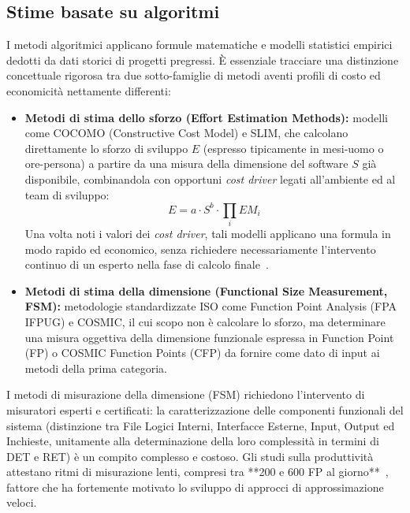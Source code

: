 \documentclass[11pt, a4paper]{article}
\begin{document}
\subsection{Stime basate su algoritmi}\label{sec:algoritmici}
I metodi algoritmici applicano formule matematiche e modelli statistici empirici dedotti da dati storici di progetti pregressi. È essenziale tracciare una distinzione concettuale rigorosa tra due sotto-famiglie di metodi aventi profili di costo ed economicità nettamente differenti:
\begin{itemize}
    \item \textbf{Metodi di stima dello sforzo (Effort Estimation Methods):} modelli come COCOMO (Constructive Cost Model) e SLIM, che calcolano direttamente lo sforzo di sviluppo $E$ (espresso tipicamente in mesi-uomo o ore-persona) a partire da una misura della dimensione del software $S$ già disponibile, combinandola con opportuni \textit{cost driver} legati all'ambiente ed al team di sviluppo:
          \begin{equation}
              E = a \cdot S^b \cdot \prod_{i} EM_i
          \end{equation}
          Una volta noti i valori dei \textit{cost driver}, tali modelli applicano una formula in modo rapido ed economico, senza richiedere necessariamente l'intervento continuo di un esperto nella fase di calcolo finale~\cite{DBLP:journals/corr/DuHC15a}.
    \item \textbf{Metodi di stima della dimensione (Functional Size Measurement, FSM):} metodologie standardizzate ISO come Function Point Analysis (FPA IFPUG) e COSMIC, il cui scopo non è calcolare lo sforzo, ma determinare una misura oggettiva della dimensione funzionale espressa in Function Point (FP) o COSMIC Function Points (CFP) da fornire come dato di input ai metodi della prima categoria.
\end{itemize}

I metodi di misurazione della dimensione (FSM) richiedono l'intervento di misuratori esperti e certificati: la caratterizzazione delle componenti funzionali del sistema (distinzione tra File Logici Interni, Interfacce Esterne, Input, Output ed Inchieste, unitamente alla determinazione della loro complessità in termini di DET e RET) è un compito complesso e costoso. Gli studi sulla produttività attestano ritmi di misurazione lenti, compresi tra **200 e 600 FP al giorno**~\cite{DIMARTINO2020106308}, fattore che ha fortemente motivato lo sviluppo di approcci di approssimazione veloci.
\end{document}
